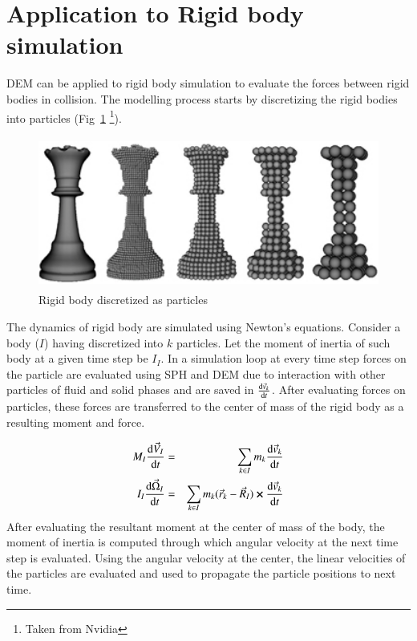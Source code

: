 \section{Application to Rigid body simulation}
\label{sec:appl-rigid-body}

DEM can be applied to rigid body simulation to evaluate the forces between rigid
bodies in collision. The modelling process starts by discretizing the rigid
bodies into particles (Fig~\ref{fig:rigid_body_particles} \footnote{Taken from Nvidia}).


\begin{figure}
  \centering
  \includegraphics[width=0.9\linewidth, height=5cm]{dem/doc_images/grid_to_particles}
  \caption{Rigid body discretized as particles}
  \label{fig:rigid_body_particles}
\end{figure}


The dynamics of rigid body are simulated using Newton's equations. Consider a
body ($I$) having discretized into $k$ particles. Let the moment of inertia of
such body at a given time step be $I_I$. In a simulation loop at every time step
forces on the particle are evaluated using SPH and DEM due to interaction with
other particles of fluid and solid phases and are saved in $\dv{\vec{v}_k}{t}$.
After evaluating forces on particles, these forces are transferred to the center
of mass of the rigid body as a resulting moment and force.

\begin{eqnarray}
  \label{eq:rigid_body_newton_equation}
  M_I \dv{\vec{V}_I}{t} &=& \sum_{k \in I} m_k \dv{\vec{v}_k}{t}\\
  I_I \dv{\vec{\Omega}_I}{t} &=& \sum_{k \in I} m_k (\vec{r}_k - \vec{R}_I) \cross \dv{\vec{v}_k}{t}
\end{eqnarray}
After evaluating the resultant moment at the center of mass of the body, the
moment of inertia is computed through which angular velocity at the next time
step is evaluated. Using the angular velocity at the center, the linear
velocities of the particles are evaluated and used to propagate the particle
positions to next time.


